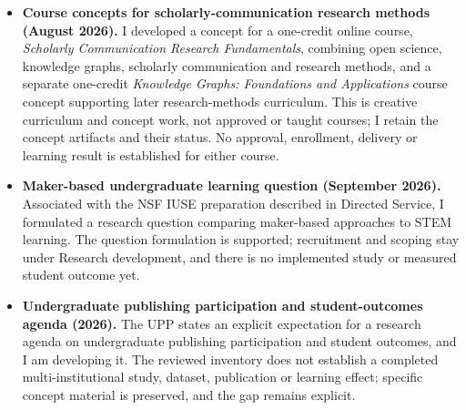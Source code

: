 \begin{itemize}
\item \textbf{Course concepts for scholarly-communication research methods (August 2026).} I developed a concept for a one-credit online course, \textit{Scholarly Communication Research Fundamentals}, combining open science, knowledge graphs, scholarly communication and research methods, and a separate one-credit \textit{Knowledge Graphs: Foundations and Applications} course concept supporting later research-methods curriculum. This is creative curriculum and concept work, not approved or taught courses; I retain the concept artifacts and their status. No approval, enrollment, delivery or learning result is established for either course.
\item \textbf{Maker-based undergraduate learning question (September 2026).} Associated with the NSF IUSE preparation described in Directed Service, I formulated a research question comparing maker-based approaches to STEM learning. The question formulation is supported; recruitment and scoping stay under Research development, and there is no implemented study or measured student outcome yet.
\item \textbf{Undergraduate publishing participation and student-outcomes agenda (2026).} The UPP states an explicit expectation for a research agenda on undergraduate publishing participation and student outcomes, and I am developing it. The reviewed inventory does not establish a completed multi-institutional study, dataset, publication or learning effect; specific concept material is preserved, and the gap remains explicit.
\end{itemize}
\par\endgroup
